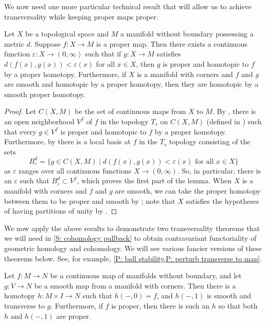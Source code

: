 We now need one more particular technical result that will allow us to achieve transversality while keeping proper maps proper.

\begin{lemma}\label{L: nearby proper homotopy}
	Let $X$ be a topological space and $M$ a manifold without boundary possessing a metric $d$.
	Suppose $f \colon X \to M$ is a proper map.
	Then there exists a continuous function $\varepsilon \colon X \to (0,\infty)$ such that if $g \colon X \to M$ satisfies $d(f(x),g(x)) < \varepsilon(x)$ for all $x \in X$, then $g$ is proper and homotopic to $f$ by a proper homotopy.
	Furthermore, if $X$ is a manifold with corners and $f$ and $g$ are smooth and homotopic by a proper homotopy, then they are homotopic by a smooth proper homotopy.
\end{lemma}

\begin{proof}
	Let $C(X,M)$ be the set of continuous maps from $X$ to $M$.
	By \cite[Proposition 9.2.28]{MaDo92}, there is an open neighborhood $V^f$ of $f$ in the topology $T_s$ on $C(X,M)$ (defined in \cite[Proposition 9.2.1]{MaDo92}) such that every $g \in V^f$ is proper and homotopic to $f$ by a proper homotopy.
	Furthermore, by \cite[Proposition 9.3.9]{MaDo92} there is a local basis at $f$ in the $T_s$ topology consisting of the sets
	$$B_\varepsilon^d = \{g \in C(X,M) \mid d(f(x),g(x)) < \varepsilon (x) \text{ for all } x \in X\}$$
	as $\varepsilon$ ranges over all continuous functions $X \to (0,\infty)$.
	So, in particular, there is an $\varepsilon$ such that $B_\varepsilon^d \subset V^f$, which proves the first part of the lemma.
	When $X$ is a manifold with corners and $f$ and $g$ are smooth, we can take the proper homotopy between them to be proper and smooth by \cite[Proposition 9.2.35]{MaDo92}; note that $X$ satisfies the hypotheses of having partitions of unity by \cite[Corollary 1.5.14]{MaDo92}.
\end{proof}


We now apply the above results to demonstrate two transversality theorems that we will need in \cref{S: cohomology pullback} to obtain contravariant functoriality of geometric homology and cohomology.
We will see various fancier versions of these theorems below.
See, for example, \cref{P: ball stability,P: perturb transverse to map}.

\begin{theorem}\label{T: basic trans}
	Let $f \colon M \to N$ be a continuous map of manifolds without boundary, and let $g \colon V \to N$ be a smooth map from a manifold with corners.
	Then there is a homotopy $h \colon M \times I \to N$ such that $h(-,0) = f$, and $h(-,1)$ is smooth and transverse to $g$.
	Furthermore, if $f$ is proper, then there is such an $h$ so that both $h$ and $h(-,1)$ are proper.
\end{theorem}

